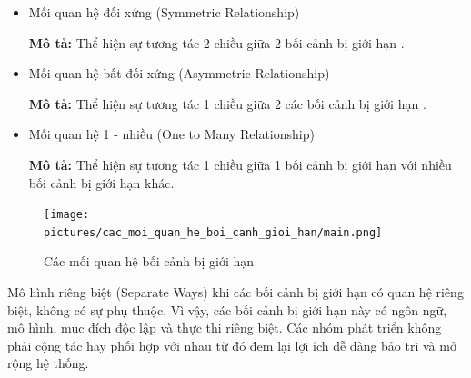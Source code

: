 \begin{itemize}

    \item Mối quan hệ đối xứng (Symmetric Relationship)

          \textbf{Mô tả:} Thể hiện sự tương tác 2 chiều giữa 2 bối cảnh bị giới hạn .

    \item Mối quan hệ bất đối xứng (Asymmetric Relationship)

          \textbf{Mô tả:} Thể hiện sự tương tác 1 chiều giữa 2 các bối cảnh bị giới hạn .

    \item Mối quan hệ 1 - nhiều (One to Many Relationship)

          \textbf{Mô tả:} Thể hiện sự tương tác 1 chiều giữa 1 bối cảnh bị giới hạn với nhiều bối cảnh bị giới hạn khác.

\end{itemize}

\begin{figure}[H]

    \centering

    \texttt{[image: pictures/cac\_moi\_quan\_he\_boi\_canh\_gioi\_han/main.png]}

    \caption{Các mối quan hệ bối cảnh bị giới hạn}

\end{figure}










Mô hình riêng biệt (Separate Ways) khi các bối cảnh bị giới hạn có quan hệ riêng biệt, không có sự phụ thuộc. Vì vậy, các bối cảnh bị giới hạn này có ngôn ngữ, mô hình, mục đích độc lập và thực thi riêng biệt. Các nhóm phát triển không phải cộng tác hay phối hợp với nhau từ đó đem lại lợi ích dễ dàng bảo trì và mở rộng hệ thống.

